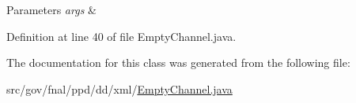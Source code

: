 \begin{DoxyParams}{Parameters}
{\em args} & \\
\hline
\end{DoxyParams}


Definition at line 40 of file Empty\-Channel.\-java.



The documentation for this class was generated from the following file\-:\begin{DoxyCompactItemize}
\item 
src/gov/fnal/ppd/dd/xml/\hyperlink{EmptyChannel_8java}{Empty\-Channel.\-java}\end{DoxyCompactItemize}
